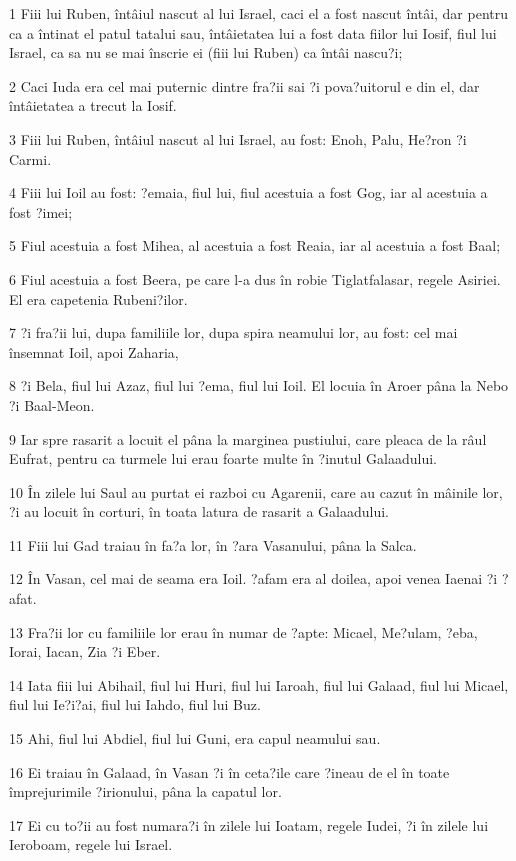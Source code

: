\par 1 Fiii lui Ruben, întâiul nascut al lui Israel, caci el a fost nascut întâi, dar pentru ca a întinat el patul tatalui sau, întâietatea lui a fost data fiilor lui Iosif, fiul lui Israel, ca sa nu se mai înscrie ei (fiii lui Ruben) ca întâi nascu?i;
\par 2 Caci Iuda era cel mai puternic dintre fra?ii sai ?i pova?uitorul e din el, dar întâietatea a trecut la Iosif.
\par 3 Fiii lui Ruben, întâiul nascut al lui Israel, au fost: Enoh, Palu, He?ron ?i Carmi.
\par 4 Fiii lui Ioil au fost: ?emaia, fiul lui, fiul acestuia a fost Gog, iar al acestuia a fost ?imei;
\par 5 Fiul acestuia a fost Mihea, al acestuia a fost Reaia, iar al acestuia a fost Baal;
\par 6 Fiul acestuia a fost Beera, pe care l-a dus în robie Tiglatfalasar, regele Asiriei. El era capetenia Rubeni?ilor.
\par 7 ?i fra?ii lui, dupa familiile lor, dupa spira neamului lor, au fost: cel mai însemnat Ioil, apoi Zaharia,
\par 8 ?i Bela, fiul lui Azaz, fiul lui ?ema, fiul lui Ioil. El locuia în Aroer pâna la Nebo ?i Baal-Meon.
\par 9 Iar spre rasarit a locuit el pâna la marginea pustiului, care pleaca de la râul Eufrat, pentru ca turmele lui erau foarte multe în ?inutul Galaadului.
\par 10 În zilele lui Saul au purtat ei razboi cu Agarenii, care au cazut în mâinile lor, ?i au locuit în corturi, în toata latura de rasarit a Galaadului.
\par 11 Fiii lui Gad traiau în fa?a lor, în ?ara Vasanului, pâna la Salca.
\par 12 În Vasan, cel mai de seama era Ioil. ?afam era al doilea, apoi venea Iaenai ?i ?afat.
\par 13 Fra?ii lor cu familiile lor erau în numar de ?apte: Micael, Me?ulam, ?eba, Iorai, Iacan, Zia ?i Eber.
\par 14 Iata fiii lui Abihail, fiul lui Huri, fiul lui Iaroah, fiul lui Galaad, fiul lui Micael, fiul lui Ie?i?ai, fiul lui Iahdo, fiul lui Buz.
\par 15 Ahi, fiul lui Abdiel, fiul lui Guni, era capul neamului sau.
\par 16 Ei traiau în Galaad, în Vasan ?i în ceta?ile care ?ineau de el în toate împrejurimile ?irionului, pâna la capatul lor.
\par 17 Ei cu to?ii au fost numara?i în zilele lui Ioatam, regele Iudei, ?i în zilele lui Ieroboam, regele lui Israel.
